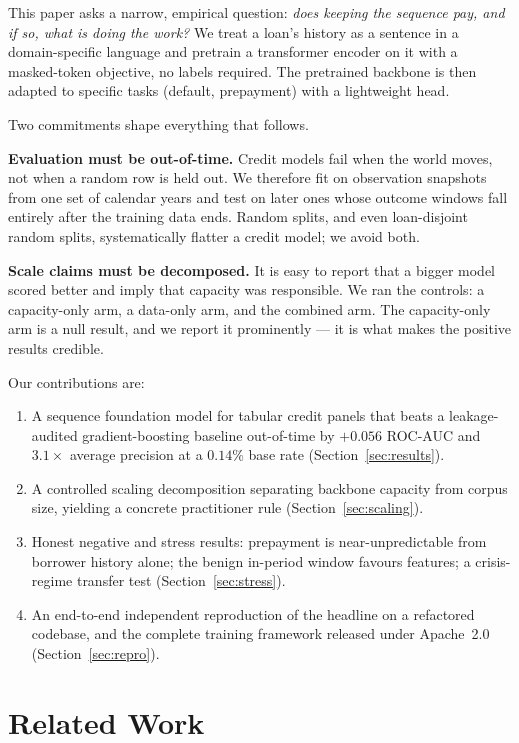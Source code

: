 \documentclass[10pt,letterpaper]{article}
\begin{document}
This paper asks a narrow, empirical question: \emph{does keeping the sequence pay, and if so, what
is doing the work?} We treat a loan's history as a sentence in a domain-specific language and
pretrain a transformer encoder on it with a masked-token objective, no labels required. The
pretrained backbone is then adapted to specific tasks (default, prepayment) with a lightweight
head.

Two commitments shape everything that follows.

\textbf{Evaluation must be out-of-time.} Credit models fail when the world moves, not when a random
row is held out. We therefore fit on observation snapshots from one set of calendar years and test
on later ones whose outcome windows fall entirely after the training data ends. Random splits, and
even loan-disjoint random splits, systematically flatter a credit model; we avoid both.

\textbf{Scale claims must be decomposed.} It is easy to report that a bigger model scored better and
imply that capacity was responsible. We ran the controls: a capacity-only arm, a data-only arm, and
the combined arm. The capacity-only arm is a null result, and we report it prominently --- it is
what makes the positive results credible.

Our contributions are:
\begin{enumerate}
  \item A sequence foundation model for tabular credit panels that beats a leakage-audited
        gradient-boosting baseline out-of-time by $+0.056$ ROC-AUC and $3.1\times$ average
        precision at a $0.14\%$ base rate (Section~\ref{sec:results}).
  \item A controlled scaling decomposition separating backbone capacity from corpus size, yielding
        a concrete practitioner rule (Section~\ref{sec:scaling}).
  \item Honest negative and stress results: prepayment is near-unpredictable from borrower history
        alone; the benign in-period window favours features; a crisis-regime transfer test
        (Section~\ref{sec:stress}).
  \item An end-to-end independent reproduction of the headline on a refactored codebase, and the
        complete training framework released under Apache~2.0 (Section~\ref{sec:repro}).
\end{enumerate}

\section{Related Work}
\label{sec:related}
\end{document}
